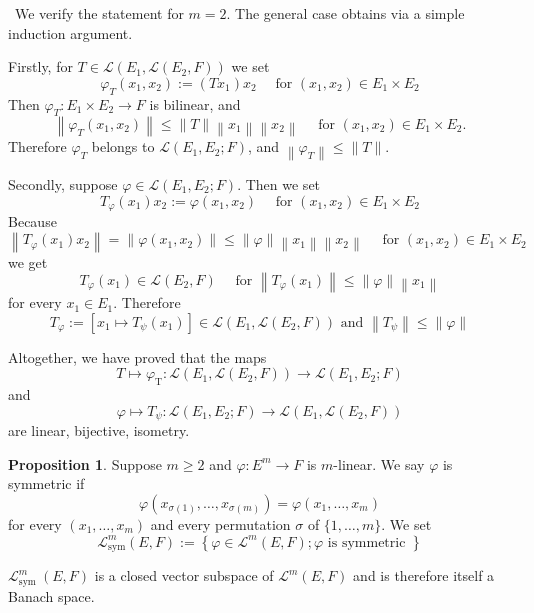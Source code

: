 \documentclass[12pt,a4paper]{book}
\newenvironment{prooff}{{\noindent\it\textcolor{cyan!40!black}{Proof}:}\,}{\par}
\theoremstyle{definition}
\newtheorem{prop}[defn]{Proposition}
\begin{document}
\begin{prooff} 
    We verify the statement for $m=2$. The general case obtains via a simple induction argument.
     
    Firstly, for $T \in \mathcal{L}\left(E_1, \mathcal{L}\left(E_2, F\right)\right)$ we set
    $$
    \varphi_T\left(x_1, x_2\right):=\left(T x_1\right) x_2 \quad \text { for }\left(x_1, x_2\right) \in E_1 \times E_2
    $$
    Then $\varphi_T: E_1 \times E_2 \rightarrow F$ is bilinear, and
    $$
    \left\|\varphi_T\left(x_1, x_2\right)\right\| \leq\|T\|\left\|x_1\right\|\left\|x_2\right\| \quad \text { for }\left(x_1, x_2\right) \in E_1 \times E_2 .
    $$
    Therefore $\varphi_T$ belongs to $\mathcal{L}\left(E_1, E_2 ; F\right)$, and $\left\|\varphi_T\right\| \leq\|T\|$.
    
    Secondly, suppose $\varphi \in \mathcal{L}\left(E_1, E_2 ; F\right)$. Then we set
    $$
    T_{\varphi}\left(x_1\right) x_2:=\varphi\left(x_1, x_2\right) \quad \text { for }\left(x_1, x_2\right) \in E_1 \times E_2
    $$
    Because
    $$
    \left\|T_{\varphi}\left(x_1\right) x_2\right\|=\left\|\varphi\left(x_1, x_2\right)\right\| \leq\|\varphi\|\left\|x_1\right\|\left\|x_2\right\| \quad \text { for }\left(x_1, x_2\right) \in E_1 \times E_2
    $$
    we get
    $$
    T_{\varphi}\left(x_1\right) \in \mathcal{L}\left(E_2, F\right) \quad \text { for }\left\|T_{\varphi}\left(x_1\right)\right\| \leq\|\varphi\|\left\|x_1\right\|
    $$
    for every $x_1 \in E_1$. Therefore
    $$
    T_{\varphi}:=\left[x_1 \mapsto T_\psi\left(x_1\right)\right] \in \mathcal{L}\left(E_1, \mathcal{L}\left(E_2, F\right)\right) \text { and }\left\|T_\psi\right\| \leq\|\varphi\|
    $$
    
    Altogether, we have proved that the maps
    $$
    T \mapsto \varphi_{\mathrm{T}}: \mathcal{L}\left(E_1, \mathcal{L}\left(E_2, F\right)\right) \rightarrow \mathcal{L}\left(E_1, E_2 ; F\right)
    $$
    and
    $$
    \varphi \mapsto T_\psi: \mathcal{L}\left(E_1, E_2 ; F\right) \rightarrow \mathcal{L}\left(E_1, \mathcal{L}\left(E_2, F\right)\right)
    $$
    are linear, bijective, isometry.
\end{prooff}
\begin{prop}
    Suppose $m \geq 2$ and $\varphi: E^m \rightarrow F$ is $m$-linear. We say $\varphi$ is symmetric if
    $$
    \varphi\left(x_{\sigma(1)}, \ldots, x_{\sigma(m)}\right)=\varphi\left(x_1, \ldots, x_m\right)
    $$
    for every $\left(x_1, \ldots, x_m\right)$ and every permutation $\sigma$ of $\{1, \ldots, m\}$. We set
    $$
    \mathcal{L}_{\mathrm{sym}}^m(E, F):=\left\{\varphi \in \mathcal{L}^m(E, F) ; \varphi \text { is symmetric }\right\}
    $$
    
    $\mathcal{L}_{\text {sym }}^m(E, F)$ is a 
    closed vector subspace of $\mathcal{L}^m(E, F)$ and is therefore itself a Banach space.
\end{prop}
\end{document}
